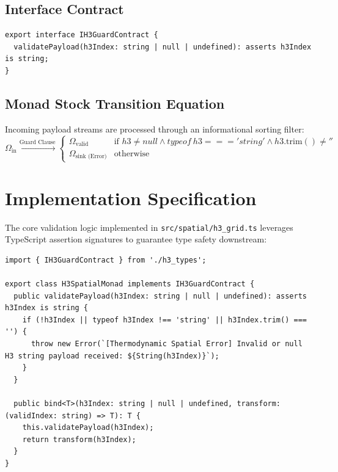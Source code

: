 \documentclass[11pt, a4paper]{article}
\begin{document}
\subsection{Interface Contract}
\begin{verbatim}
export interface IH3GuardContract {
  validatePayload(h3Index: string | null | undefined): asserts h3Index is string;
}
\end{verbatim}

\subsection{Monad Stock Transition Equation}
Incoming payload streams are processed through an informational sorting filter:
\begin{equation}
\Omega_{\text{in}} \xrightarrow{\text{Guard Clause}} \begin{cases} 
\Omega_{\text{valid}} & \text{if } h3 \neq null \land typeof \ h3 === 'string' \land h3.\text{trim}() \neq '' \\ 
\Omega_{\text{sink (Error)}} & \text{otherwise} 
\end{cases}
\end{equation}

\section{Implementation Specification}
The core validation logic implemented in \texttt{src/spatial/h3\_grid.ts} leverages TypeScript assertion signatures to guarantee type safety downstream:

\begin{verbatim}
import { IH3GuardContract } from './h3_types';

export class H3SpatialMonad implements IH3GuardContract {
  public validatePayload(h3Index: string | null | undefined): asserts h3Index is string {
    if (!h3Index || typeof h3Index !== 'string' || h3Index.trim() === '') {
      throw new Error(`[Thermodynamic Spatial Error] Invalid or null H3 string payload received: ${String(h3Index)}`);
    }
  }

  public bind<T>(h3Index: string | null | undefined, transform: (validIndex: string) => T): T {
    this.validatePayload(h3Index);
    return transform(h3Index);
  }
}
\end{verbatim}
\end{document}
